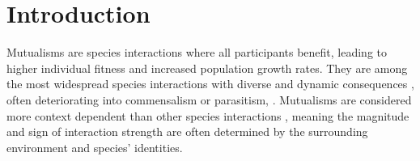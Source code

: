 \documentclass[11pt]{article}\usepackage[sc]{mathpazo} %
\begin{document}
\newpage{}
\section*{Introduction}

  Mutualisms are species interactions where all participants benefit, leading to higher individual fitness and increased population growth rates. 
They are among the most widespread species interactions \cite{Chamberlain2014, BoucherDouglasH.1985} with diverse and dynamic consequences \cite{Bronstein1994,Chamberlain2014,Frederickson2013}, often deteriorating into commensalism or parasitism,  \cite{Rodriguez-Rodriguez2017,Song2020,Mandyam2014,Thrall2007, Bahia2022}.
Mutualisms are considered more context dependent than other species interactions \cite{Chamberlain2014,Frederickson2013}, meaning the magnitude and sign of interaction strength are often determined by the surrounding environment and species' identities. 
\end{document}
